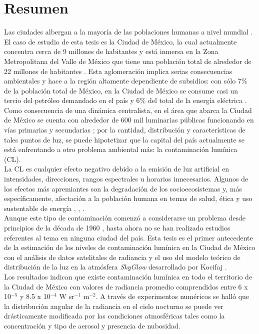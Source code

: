 \chapter{Resumen}

Las ciudades albergan a la mayoría de las poblaciones humanas a nivel mundial \citep{Zari2018}. El caso de estudio de esta tesis es la Ciudad de México, la cual actualmente concentra cerca de 9 millones de habitantes \citep{INEGI2015} y está inmersa en la Zona Metropolitana del Valle de México que tiene una población total de alrededor de 22 millones de habitantes \citep{OCDE2015}. Esta aglomeración implica serias consecuencias ambientales y hace a la región altamente dependiente de subsidios: con sólo 7\% de la población total de México, en la Ciudad de México se consume casi un tercio del petróleo demandado en el país y 6\% del total de la energía eléctrica \citep{SENER2013}.\\

Como consecuencia de una dinámica centralista, en el área que abarca la Ciudad de México se cuenta con alrededor de 600 mil luminarias públicas funcionando en vías primarias y secundarias \citep{INFO2019}; por la cantidad, distribución y características de tales puntos de luz, se puede hipotetizar que la capital del país actualmente se está enfrentando a otro problema ambiental más: la contaminación lumínica (CL).\\

La CL es cualquier efecto negativo debido a la emisión de luz artificial en intensidades, direcciones, rangos espectrales u horarios innecesarios. Algunos de los efectos más apremiantes son la degradación de los socioecosistemas y, más específicamente, afectación a la población humana en temas de salud, ética y uso sustentable de energía \citep{AtlasREPSA}, \citep{LibroCL}, \citep{Stone2017}.\\

Aunque este tipo de contaminación comenzó a considerarse un problema desde principios de la década de 1960 \citep{LibroCL}, hasta ahora no se han realizado estudios referentes al tema en ninguna ciudad del país. Esta tesis es el primer antecedente de la estimación de los niveles de contaminación lumínica en la Ciudad de México con el análisis de datos satelitales de radiancia y el uso del modelo teórico de distribución de la luz en la atmósfera \textit{SkyGlow} desarrollado por Kocifaj \citep{Kocifaj2007}.\\

Los resultados indican que existe contaminación lumínica en todo el territorio de la Ciudad de México con valores de radiancia promedio comprendidos entre 6 x 10$^{-5}$ y 8.5 x 10$^{-4}$ W sr$^{-1}$ m$^{-2}$. A través de experimentos numéricos se halló que la distribución angular de la radiancia en el cielo nocturno se puede ver drásticamente modificada por las condiciones atmosféricas tales como la concentración y tipo de aerosol y presencia de nubosidad.\\

